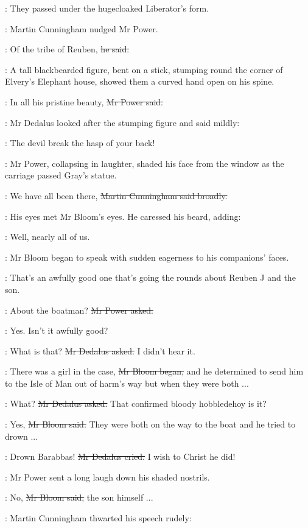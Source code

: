 :
They passed under the hugecloaked Liberator's form.

:
Martin Cunningham nudged Mr Power.

\cunningham:
Of the tribe of Reuben,
\sout{he said.}

:
A tall blackbearded figure, bent on a stick,
stumping round the corner of Elvery's Elephant house,
showed them a curved hand open on his spine.

\power:
In all his pristine beauty,
\sout{Mr Power said.}

:
Mr Dedalus looked after the stumping figure and said mildly:

\simon:
The devil break the hasp of your back!

:
Mr Power, collapsing in laughter,
shaded his face from the window as the carriage passed Gray's statue.

\cunningham:
We have all been there,
\sout{Martin Cunningham said broadly.}

:
His eyes met Mr Bloom's eyes.
He caressed his beard, adding:

\cunningham:
Well, nearly all of us.

:
Mr Bloom began to speak with sudden eagerness to his companions' faces.

\Bloom:
That's an awfully good one that's going the rounds
about Reuben J and the son.

\power:
About the boatman?
\sout{Mr Power asked.}

\Bloom:
Yes.
Isn't it awfully good?

\simon:
What is that?
\sout{Mr Dedalus asked.}
I didn't hear it.

\Bloom:
There was a girl in the case,
\sout{Mr Bloom began,}
and he determined to send him
to the Isle of Man out of harm's way
but when they were both ...

\simon:
What?
\sout{Mr Dedalus asked.}
That confirmed bloody hobbledehoy is it?

\Bloom:
Yes,
\sout{Mr Bloom said.}
They were both on the way to the boat and he tried to drown ...

\simon:
Drown Barabbas!
\sout{Mr Dedalus cried.}
I wish to Christ he did!

:
Mr Power sent a long laugh down his shaded nostrils.

\Bloom:
No,
\sout{Mr Bloom said,}
the son himself ...

:
Martin Cunningham thwarted his speech rudely:


